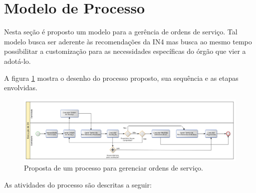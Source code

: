 \section{Modelo de Processo}

Nesta seção é proposto um modelo para a gerência de ordens de serviço. Tal
modelo busca ser aderente às recomendações da IN4 mas busca ao mesmo tempo
possibilitar a customização para as necessidades específicas do órgão que vier
a adotá-lo.

A figura \ref{fig:so_process} mostra o desenho do processo proposto, sua
sequência e as etapas envolvidas.

\begin{figure}[H]
  \centering
  \includegraphics[keepaspectratio=true,scale=0.5]{figures/so_process}
  \caption{Proposta de um processo para gerenciar ordens de serviço.}
  \label{fig:so_process}
\end{figure}

As atividades do processo são descritas a seguir:

